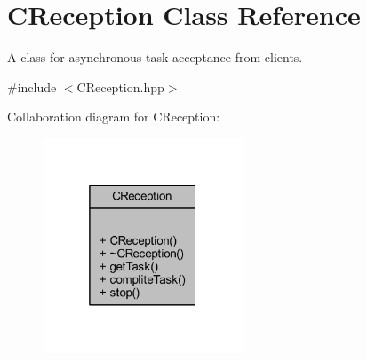 \hypertarget{class_c_reception}{}\section{C\+Reception Class Reference}
\label{class_c_reception}


A class for asynchronous task acceptance from clients.  




{\ttfamily \#include $<$C\+Reception.\+hpp$>$}



Collaboration diagram for C\+Reception\+:
\nopagebreak
\begin{figure}[H]
\begin{center}
\leavevmode
\includegraphics[width=169pt]{class_c_reception__coll__graph}
\end{center}
\end{figure}
